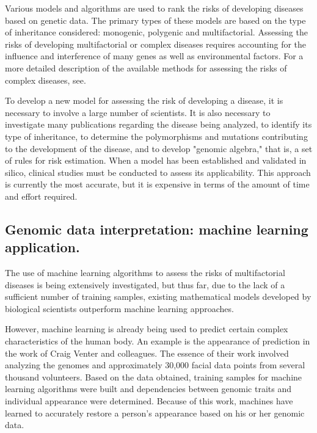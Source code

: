 Various models and algorithms are used to rank the risks of developing diseases based on genetic data. The primary types of these models are based on the type of inheritance considered: monogenic, polygenic and multifactorial. Assessing the risks of developing multifactorial or complex diseases requires accounting for the influence and interference of many genes as well as environmental factors. For a more detailed description of the available methods for assessing the risks of complex diseases, see\cite{Kalf2014,nature:complex-disease-risk}.

To develop a new model for assessing the risk of developing a disease, it is necessary to involve a large number of scientists. It is also necessary to investigate many publications regarding the disease being analyzed, to identify its type of inheritance, to determine the polymorphisms and mutations contributing to the development of the disease, and to develop "genomic algebra," that is, a set of rules for risk estimation. When a model has been established and validated in silico, clinical studies must be conducted to assess its applicability. This approach is currently the most accurate, but it is expensive in terms of the amount of time and effort required.

\subsection[Genomic data interpretation]{Genomic data interpretation: machine learning application.}
The use of machine learning algorithms to assess the risks of multifactorial diseases is being extensively investigated, but thus far, due to the lack of a sufficient number of training samples, existing mathematical models developed by biological scientists outperform machine learning approaches.

However, machine learning is already being used to predict certain complex characteristics of the human body. An example is the appearance of prediction in the work of Craig Venter and colleagues. The essence of their work involved analyzing the genomes and approximately 30,000 facial data points from several thousand volunteers. Based on the data obtained, training samples for machine learning algorithms were built and dependencies between genomic traits and individual appearance were determined. Because of this work, machines have learned to accurately restore a person's appearance based on his or her genomic data\cite{wired.co.uk:longevitydiseases,Telenti18102016}.

